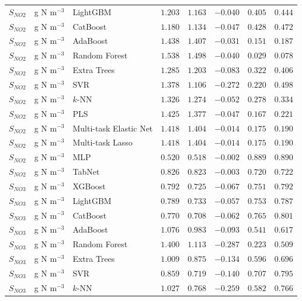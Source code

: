 \begin{longtable}{llp{3.1cm}rrrrr}
$S_{NO2}$ & g N m$^{-3}$ & LightGBM & $1.203$ & $1.163$ & $-0.040$ & $0.405$ & $0.444$ \\
$S_{NO2}$ & g N m$^{-3}$ & CatBoost & $1.180$ & $1.134$ & $-0.047$ & $0.428$ & $0.472$ \\
$S_{NO2}$ & g N m$^{-3}$ & AdaBoost & $1.438$ & $1.407$ & $-0.031$ & $0.151$ & $0.187$ \\
$S_{NO2}$ & g N m$^{-3}$ & Random Forest & $1.538$ & $1.498$ & $-0.040$ & $0.029$ & $0.078$ \\
$S_{NO2}$ & g N m$^{-3}$ & Extra Trees & $1.285$ & $1.203$ & $-0.083$ & $0.322$ & $0.406$ \\
$S_{NO2}$ & g N m$^{-3}$ & SVR & $1.378$ & $1.106$ & $-0.272$ & $0.220$ & $0.498$ \\
$S_{NO2}$ & g N m$^{-3}$ & $k$-NN & $1.326$ & $1.274$ & $-0.052$ & $0.278$ & $0.334$ \\
$S_{NO2}$ & g N m$^{-3}$ & PLS & $1.425$ & $1.377$ & $-0.047$ & $0.167$ & $0.221$ \\
$S_{NO2}$ & g N m$^{-3}$ & Multi-task Elastic Net & $1.418$ & $1.404$ & $-0.014$ & $0.175$ & $0.190$ \\
$S_{NO2}$ & g N m$^{-3}$ & Multi-task Lasso & $1.418$ & $1.404$ & $-0.014$ & $0.175$ & $0.190$ \\
$S_{NO2}$ & g N m$^{-3}$ & MLP & $0.520$ & $0.518$ & $-0.002$ & $0.889$ & $0.890$ \\
$S_{NO2}$ & g N m$^{-3}$ & TabNet & $0.826$ & $0.823$ & $-0.003$ & $0.720$ & $0.722$ \\
$S_{NO3}$ & g N m$^{-3}$ & XGBoost & $0.792$ & $0.725$ & $-0.067$ & $0.751$ & $0.792$ \\
$S_{NO3}$ & g N m$^{-3}$ & LightGBM & $0.789$ & $0.733$ & $-0.057$ & $0.753$ & $0.787$ \\
$S_{NO3}$ & g N m$^{-3}$ & CatBoost & $0.770$ & $0.708$ & $-0.062$ & $0.765$ & $0.801$ \\
$S_{NO3}$ & g N m$^{-3}$ & AdaBoost & $1.076$ & $0.983$ & $-0.093$ & $0.541$ & $0.617$ \\
$S_{NO3}$ & g N m$^{-3}$ & Random Forest & $1.400$ & $1.113$ & $-0.287$ & $0.223$ & $0.509$ \\
$S_{NO3}$ & g N m$^{-3}$ & Extra Trees & $1.009$ & $0.875$ & $-0.134$ & $0.596$ & $0.696$ \\
$S_{NO3}$ & g N m$^{-3}$ & SVR & $0.859$ & $0.719$ & $-0.140$ & $0.707$ & $0.795$ \\
$S_{NO3}$ & g N m$^{-3}$ & $k$-NN & $1.027$ & $0.768$ & $-0.259$ & $0.582$ & $0.766$ \\

\end{longtable}
